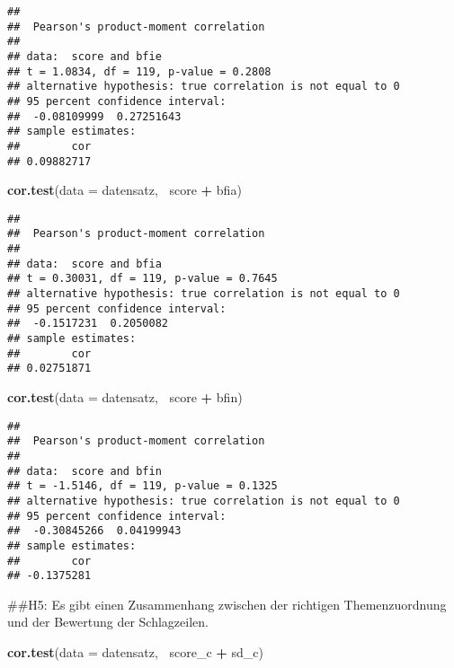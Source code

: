 \documentclass[]{article}
\newenvironment{Shaded}{\begin{snugshade}}{\end{snugshade}}
\newcommand{\KeywordTok}[1]{\textcolor[rgb]{0.13,0.29,0.53}{\textbf{#1}}}
\newcommand{\DataTypeTok}[1]{\textcolor[rgb]{0.13,0.29,0.53}{#1}}
\newcommand{\StringTok}[1]{\textcolor[rgb]{0.31,0.60,0.02}{#1}}
\newcommand{\OperatorTok}[1]{\textcolor[rgb]{0.81,0.36,0.00}{\textbf{#1}}}
\newcommand{\NormalTok}[1]{#1}
\begin{document}
\begin{verbatim}
## 
##  Pearson's product-moment correlation
## 
## data:  score and bfie
## t = 1.0834, df = 119, p-value = 0.2808
## alternative hypothesis: true correlation is not equal to 0
## 95 percent confidence interval:
##  -0.08109999  0.27251643
## sample estimates:
##        cor 
## 0.09882717
\end{verbatim}

\begin{Shaded}
\begin{Highlighting}[]
\KeywordTok{cor.test}\NormalTok{(}\DataTypeTok{data =}\NormalTok{ datensatz, }\OperatorTok{~}\NormalTok{score }\OperatorTok{+}\StringTok{ }\NormalTok{bfia)}
\end{Highlighting}
\end{Shaded}

\begin{verbatim}
## 
##  Pearson's product-moment correlation
## 
## data:  score and bfia
## t = 0.30031, df = 119, p-value = 0.7645
## alternative hypothesis: true correlation is not equal to 0
## 95 percent confidence interval:
##  -0.1517231  0.2050082
## sample estimates:
##        cor 
## 0.02751871
\end{verbatim}

\begin{Shaded}
\begin{Highlighting}[]
\KeywordTok{cor.test}\NormalTok{(}\DataTypeTok{data =}\NormalTok{ datensatz, }\OperatorTok{~}\NormalTok{score }\OperatorTok{+}\StringTok{ }\NormalTok{bfin)}
\end{Highlighting}
\end{Shaded}

\begin{verbatim}
## 
##  Pearson's product-moment correlation
## 
## data:  score and bfin
## t = -1.5146, df = 119, p-value = 0.1325
## alternative hypothesis: true correlation is not equal to 0
## 95 percent confidence interval:
##  -0.30845266  0.04199943
## sample estimates:
##        cor 
## -0.1375281
\end{verbatim}

\begin{Shaded}
\begin{Highlighting}[]
\NormalTok{##H5: Es gibt einen Zusammenhang zwischen der richtigen Themenzuordnung und der Bewertung der Schlagzeilen.}

\KeywordTok{cor.test}\NormalTok{(}\DataTypeTok{data =}\NormalTok{ datensatz, }\OperatorTok{~}\NormalTok{score_c }\OperatorTok{+}\StringTok{ }\NormalTok{sd_c)}
\end{Highlighting}
\end{Shaded}
\end{document}
